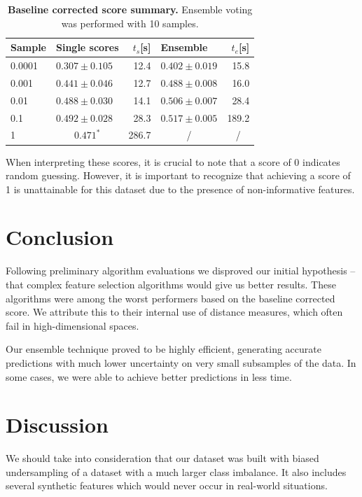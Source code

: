 \documentclass[fleqn,moreauthors,10pt]{ds_report}
\begin{document}
\begin{table}[!h]
  \centering
  \caption{\textbf{Baseline corrected score summary.} Ensemble voting was performed with 10 samples.}
  \begin{tabular}{llr|lr}
    \toprule
    Sample & Single scores & $t_s$[s] & Ensemble  & $t_e$[s] \\
    \midrule
    0.0001 & $0.307\pm 0.105$ & 12.4 & $0.402\pm0.019$ & 15.8 \\
    0.001  & $0.441\pm 0.046$ & 12.7 & $0.488\pm0.008$ & 16.0 \\
    0.01   & $0.488\pm 0.030$ & 14.1 & $0.506\pm0.007$ & 28.4 \\
    0.1    & $0.492\pm 0.028$ & 28.3 & $0.517\pm0.005$ & 189.2  \\
    1      & \multicolumn{1}{c}{$0.471^*$} & 286.7 & \multicolumn{1}{c}{/} & \multicolumn{1}{c}{/} \\
    \bottomrule
  \end{tabular}
  \label{tab:performance}
\end{table}

When interpreting these scores, it is crucial to note that a score of 0 indicates random guessing. However, it is important to recognize that achieving a score of 1 is unattainable for this dataset due to the presence of non-informative features.

\section*{Conclusion}

Following preliminary algorithm evaluations we disproved our initial hypothesis -- that complex feature selection algorithms would give us better results. These algorithms were among the worst performers based on the baseline corrected score. We attribute this to their internal use of distance measures, which often fail in high-dimensional spaces.

Our ensemble technique proved to be highly efficient, generating accurate predictions with much lower uncertainty on very small subsamples of the data. In some cases, we were able to achieve better predictions in less time.

\section*{Discussion}

We should take into consideration that our dataset was built with biased undersampling of a dataset with a much larger class imbalance. It also includes several synthetic features which would never occur in real-world situations. 
\end{document}
